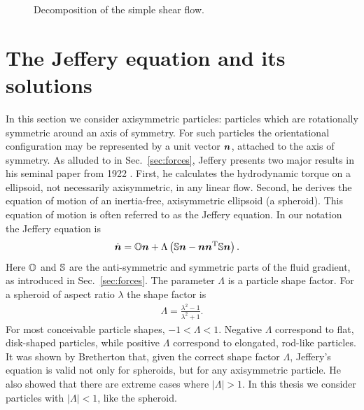 \documentclass[thesis.tex]{subfiles}
\begin{document}
\begin{figure}
\begin{center}
\end{center}
\caption{\label{fig:shear_decomposition} Decomposition of the simple shear flow.}%
\end{figure}


\section{The Jeffery equation and its solutions}\label{sec:jefferyequation}

In this section we consider axisymmetric particles: particles which are rotationally symmetric around an axis of symmetry. For such particles the orientational configuration may be represented by a unit vector $\mbox{\boldmath$n$}$, attached to the axis of symmetry. As alluded to in Sec.~\ref{sec:forces}, Jeffery presents two major results in his seminal paper from 1922 \cite{jeffery1922}. First, he calculates the hydrodynamic torque on a ellipsoid, not necessarily axisymmetric, in any linear flow. Second, he derives the equation of motion of an inertia-free, axisymmetric ellipsoid (a spheroid). This equation of motion is often referred to as the Jeffery equation. In our notation the Jeffery equation is
\begin{align}
	\dot{\ve n} &= \ma O \ve n + \Lambda \left(\ma S \ve n - \ve n \ve n \transpose \ma S \ve n\right).\eqnlab{jeffery}
\end{align}
Here $\mathbb{O}$ and $\mathbb{S}$ are the anti-symmetric and symmetric parts of the fluid gradient, as introduced in Sec.~\ref{sec:forces}. The parameter $\Lambda$ is a particle shape factor. For a spheroid of aspect ratio $\lambda$ the shape factor is
\begin{align*}
	\Lambda = \frac{\lambda^2-1}{\lambda^2+1}.
\end{align*}
For most conceivable particle shapes, $-1 < \Lambda < 1$. Negative $\Lambda$ correspond to flat, disk-shaped particles, while positive $\Lambda$ correspond to elongated, rod-like particles. It was shown by Bretherton \cite{bretherton1962} that, given the correct shape factor $\Lambda$, Jeffery's equation is valid not only for spheroids, but for any axisymmetric particle. He also showed that there are extreme cases where $|\Lambda|>1$. In this thesis we consider particles with $|\Lambda|<1$, like the spheroid.
\end{document}
